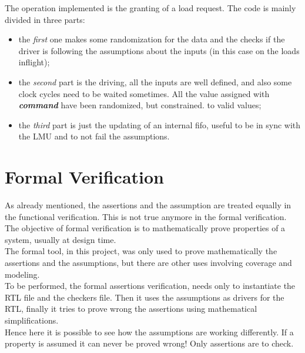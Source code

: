 The operation implemented is the granting of a load request. The code is mainly divided in three parts: 
\begin{itemize}
    \item the \emph{first} one makes some randomization for the data and the checks if the driver is following the assumptions about the inputs (in this case on the loads inflight);
    
    \item the \emph{second} part is the driving, all the inputs are well defined, and also some clock cycles need to be waited sometimes. All the value assigned with \textbf{\emph{command}} have been randomized, but constrained. to valid values;
    
    \item the \emph{third} part is just the updating of an internal fifo, useful to be in sync with the LMU and to not fail the assumptions.
\end{itemize}  
\bigskip






\section{Formal Verification}
As already mentioned, the assertions and the assumption are treated equally in the functional verification. This is not true anymore in the formal verification.\\

The objective of formal veriﬁcation is to mathematically prove properties of a system, usually at design time\cite{verification-book-2018-formal}.\\
The formal tool, in this project, was only used to prove mathematically the assertions and the assumptions, but there are other uses involving coverage and modeling.\\

To be performed, the formal assertions verification, needs only to instantiate the RTL file and the checkers file. Then it uses the assumptions as drivers for the RTL, finally it tries to prove wrong the assertions using mathematical simplifications.\\

Hence here it is possible to see how the assumptions are working differently. If a property is assumed it can never be proved wrong! Only assertions are to check.\\

